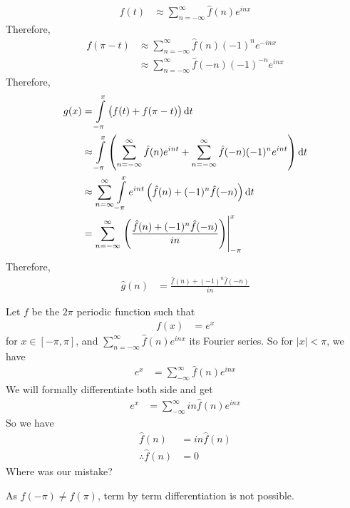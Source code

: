 \documentclass[fleqn, a4paper, 11pt, oneside]{amsart}
\theoremstyle{definition}
\theoremstyle{theorem}
\begin{document}
\begin{solution}
	\begin{align*}
		f(t) & \approx \sum\limits_{n = -\infty}^{\infty} \hat{f}(n) e^{i n x}
	\end{align*}
	Therefore,
	\begin{align*}
		f(\pi - t) & \approx \sum\limits_{n = -\infty}^{\infty} \hat{f}(n) (-1)^n e^{-i n x} \\
                           & \approx \sum\limits_{n = -\infty}^{\infty} \hat{f}(-n) (-1)^{-n} e^{i n x}
	\end{align*}
	Therefore,
	\begin{align*}
		g(x) & = \int\limits_{-\pi}^{x} \left( f(t) + f(\pi - t) \right) \dif t                                                                                                               \\
                     & \approx \int\limits_{-\pi}^{x} \left( \sum\limits_{n = -\infty}^{\infty} \hat{f}(n) e^{i n t} + \sum\limits_{n = -\infty}^{\infty} \hat{f}(-n) (-1)^n e^{i n t} \right) \dif t \\
                     & \approx \sum\limits_{n = \infty}^{\infty} \int\limits_{-\pi}^{x} e^{i n t} \left( \hat{f}(n) + (-1)^n \hat{f}(-n) \right) \dif t                                               \\
                     & = \sum\limits_{n = -\infty}^{\infty} \left. \left( \frac{\hat{f}(n) + (-1)^n \hat{f}(-n)}{i n} \right) \right|_{-\pi}^{x}
	\end{align*}
	Therefore,
	\begin{align*}
		\hat{g}(n) & = \frac{\hat{f}(n) + (-1)^n \hat{f}(-n)}{i n}
	\end{align*}
\end{solution}

\begin{question}
	Let $f$ be the $2 \pi$ periodic function such that
	\begin{align*}
		f(x) & = e^x
	\end{align*}
	for $x \in [-\pi,\pi]$, and $\sum\limits_{n = -\infty}^{\infty} \hat{f}(n) e^{i n x}$ its Fourier series.
	So for $|x| < \pi$, we have
	\begin{align*}
		e^x & = \sum\limits_{-\infty}^{\infty} \hat{f}(n) e^{i n x}
	\end{align*}
	We will formally differentiate both side and get
	\begin{align*}
		e^x & = \sum\limits_{-\infty}^{\infty} i n \hat{f}(n) e^{i n x}
	\end{align*}
	So we have 
	\begin{align*}
		\hat{f}(n)            & = i n \hat{f}(n) \\
		\therefore \hat{f}(n) & = 0
	\end{align*}
	Where was our mistake?
\end{question}

\begin{solution}
	As $f(-\pi) \neq f(\pi)$, term by term differentiation is not possible.
\end{solution}
\end{document}
